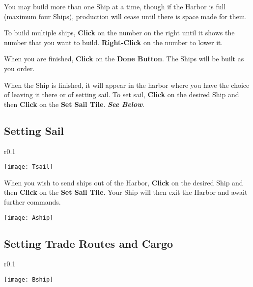 You may build more than one Ship at a time, though if the Harbor is full (maximum four Ships), production will cease until there is space made for them.

To build multiple ships, \textbf{Click} on the number on the right until it shows the number that you want to build. \textbf{Right-Click} on the number to lower it.

When you are finished, \textbf{Click} on the \textbf{Done Button}. The Ships will be built as you order.

When the Ship is finished, it will appear in the harbor where you have the choice of leaving it there or of setting sail. To set sail, \textbf{Click} on the desired Ship and then \textbf{Click} on the \textbf{Set Sail Tile}. \textbf{\textit{See Below}}.

\subsection{\textsf{Setting Sail}}


\begin{wrapfigure}{r}{0.1\textwidth}
    \vspace{-20pt}
    \begin{center}
        \texttt{[image: Tsail]}
    \end{center}
    \vspace{-20pt}
\end{wrapfigure}

When you wish to send ships out of the Harbor, \textbf{Click} on the desired Ship and then \textbf{Click} on the \textbf{Set Sail Tile}. Your Ship will then exit the Harbor and await further commands.

\clearpage

\begin{center}
    \texttt{[image: Aship]}
\end{center}

\subsection{\textsf{Setting Trade Routes and Cargo}}


\begin{wrapfigure}{r}{0.1\textwidth}
    \vspace{-20pt}
    \begin{center}
        \texttt{[image: Bship]} %
    \end{center}
    \vspace{-20pt}
\end{wrapfigure}


